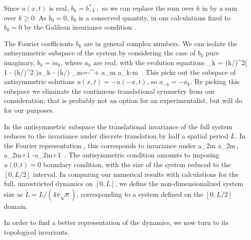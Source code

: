 Since $u(x,t)$ is real,
$ %
b_k=b_{-k}^*
\,,
$ %
so we can replace the sum over $k$ in  by a
sum over $k \geq 0$.
As  $\dot{b_0}=0$, $b_0$ is a conserved quantity,
in our calculations
fixed to $b_0=0$ by
the Galilean invariance condition .

The Fourier coefficients $b_k$ are in general complex numbers.
We can
isolate the antisymmetric subspace of the system  by
considering the case of $b_k$ pure imaginary, $b_k= i a_k$, where
$a_k$ are real, with the evolution equations
\beq
_k = (k/)^2\left( 1 - (k/)^2  \right)a_k 
 	 - (k/) \sum_{m=-\infty}^{+\infty} a_m a_{k-m}
\,.
This picks out the subspace of 
antisymmetric solutions $u(x,t)=-u(-x,t)$,
so $a_{-k}= - a_k$. By picking this subspace we eliminate
the continuous translational symmetry from our consideration;
that is probably not an option for an experimentalist,
but will do for our purposes.

In the antisymmetric subspace the translational 
invariance of the full system reduces
to the invariance under discrete
translation by half a spatial period $L$.
In the Fourier representation , 
this corresponds to invariance under 
\beq
a_{2m} \to a_{2m}\,, a_{2m+1} \to -a_{2m+1}
\,.
The antisymmetric condition amounts to imposing
$u(0,t)=0$ boundary condition, with
the size of the system reduced to
the $[0,L/2]$ interval. In
comparing our numerical results with %
calculations for
the full, unrestricted dynamics on $[0,L]$, we define
the non-dimensionalized system size as
$\tilde{L} = {L}/{(4 \pi \sqrt{\nu})}$,
corresponding to a system defined on the
$[0,L/2]$ domain. 


In order to find a better representation of the dynamics, we now
turn to its topological invariants.

